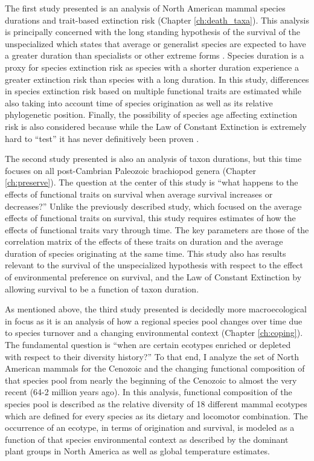 The first study presented is an analysis of North American mammal species durations and trait-based extinction risk (Chapter \ref{ch:death_taxa}). This analysis is principally concerned with the long standing hypothesis of the survival of the unspecialized which states that average or generalist species are expected to have a greater duration than specialists or other extreme forms \citep{Simpson1944,Liow2004a,Liow2007b}. Species duration is a proxy for species extinction risk as species with a shorter duration experience a greater extinction risk than species with a long duration. In this study, differences in species extinction risk based on multiple functional traits are estimated while also taking into account time of species origination as well as its relative phylogenetic position. Finally, the possibility of species age affecting extinction risk is also considered because while the Law of Constant Extinction is extremely hard to ``test'' it has never definitively been proven \citep{VanValen1973,Liow2011a}.

The second study presented is also an analysis of taxon durations, but this time focuses on all post-Cambrian Paleozoic brachiopod genera (Chapter \ref{ch:preserve}). The question at the center of this study is ``what happens to the effects of functional traits on survival when average survival increases or decreases?'' Unlike the previously described study, which focused on the average effects of functional traits on survival, this study requires estimates of how the effects of functional traits vary through time. The key parameters are those of the correlation matrix of the effects of these traits on duration and the average duration of species originating at the same time. This study also has results relevant to the survival of the unspecialized hypothesis with respect to the effect of environmental preference on survival, and the Law of Constant Extinction by allowing survival to be a function of taxon duration.

As mentioned above, the third study presented is decidedly more macroecological in focus as it is an analysis of how a regional species pool changes over time due to species turnover and a changing environmental context (Chapter \ref{ch:coping}). The fundamental question is ``when are certain ecotypes enriched or depleted with respect to their diversity history?'' To that end, I analyze the set of North American mammals for the Cenozoic and the changing functional composition of that species pool from nearly the beginning of the Cenozoic to almost the very recent (64-2 million years ago). In this analysis, functional composition of the species pool is described as the relative diversity of 18 different mammal ecotypes which are defined for every species as its dietary and locomotor combination. The occurrence of an ecotype, in terms of origination and survival, is modeled as a function of that species environmental context as described by the dominant plant groups in North America as well as global temperature estimates.

